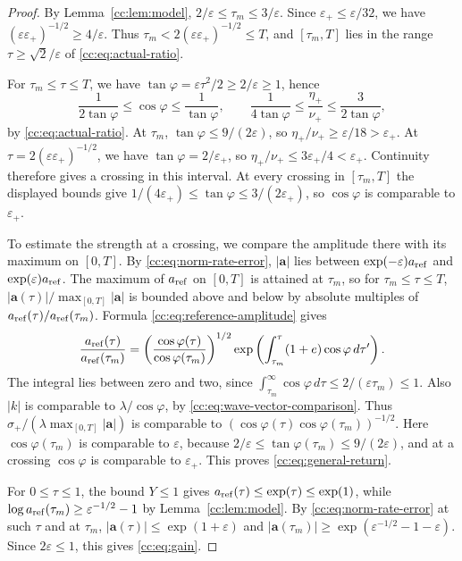 \begin{proof}
By Lemma~\ref{cc:lem:model}, $2/\varepsilon\le\tau_m\le3/\varepsilon$.
Since $\varepsilon_+\le\varepsilon/32$, we have
$(\varepsilon\varepsilon_+)^{-1/2}\ge4/\varepsilon$. Thus
$\tau_m<2(\varepsilon\varepsilon_+)^{-1/2}\le T$, and $[\tau_m,T]$ lies
in the range $\tau\ge\sqrt2/\varepsilon$ of \eqref{cc:eq:actual-ratio}.

For $\tau_m\le\tau\le T$, we have
$\tan\varphi=\varepsilon\tau^2/2\ge2/\varepsilon\ge1$, hence
\[
 \frac1{2\tan\varphi}\le\cos\varphi\le\frac1{\tan\varphi},\qquad
 \frac1{4\tan\varphi}\le\frac{\eta_+}{\nu_+}\le\frac3{2\tan\varphi},
\]
by \eqref{cc:eq:actual-ratio}. At $\tau_m$,
$\tan\varphi\le9/(2\varepsilon)$, so
$\eta_+/\nu_+\ge\varepsilon/18>\varepsilon_+$. At
$\tau=2(\varepsilon\varepsilon_+)^{-1/2}$, we have
$\tan\varphi=2/\varepsilon_+$, so
$\eta_+/\nu_+\le3\varepsilon_+/4<\varepsilon_+$.
Continuity therefore gives a crossing in this interval. At every
crossing in $[\tau_m,T]$ the displayed bounds give
$1/(4\varepsilon_+)\le\tan\varphi\le3/(2\varepsilon_+)$, so
$\cos\varphi$ is comparable to $\varepsilon_+$.

To estimate the strength at a crossing, we compare the amplitude there
with its maximum on $[0,T]$. By \eqref{cc:eq:norm-rate-error},
$|\mathbf a|$ lies between $\exp(-\varepsilon)a_{\rm ref}$ and
$\exp(\varepsilon)a_{\rm ref}$. The maximum of $a_{\rm ref}$ on
$[0,T]$ is attained at $\tau_m$, so for $\tau_m\le\tau\le T$,
$|\mathbf a(\tau)|/\max_{[0,T]}|\mathbf a|$ is bounded above and below
by absolute multiples of $a_{\rm ref}(\tau)/a_{\rm ref}(\tau_m)$.
Formula \eqref{cc:eq:reference-amplitude} gives
\[
 \frac{a_{\rm ref}(\tau)}{a_{\rm ref}(\tau_m)}
 =\left(\frac{\cos\varphi(\tau)}{\cos\varphi(\tau_m)}\right)^{1/2}
   \exp\left(\int_{\tau_m}^{\tau}(1+e)\cos\varphi\,d\tau'\right).
\]
The integral lies between zero and two, since
$\int_{\tau_m}^\infty\cos\varphi\,d\tau\le2/(\varepsilon\tau_m)\le1$.
Also $|k|$ is comparable to $\lambda/\cos\varphi$, by
\eqref{cc:eq:wave-vector-comparison}. Thus
$\sigma_+/(\lambda\max_{[0,T]}|\mathbf a|)$ is comparable to
$(\cos\varphi(\tau)\cos\varphi(\tau_m))^{-1/2}$.
Here $\cos\varphi(\tau_m)$ is comparable to $\varepsilon$, because
$2/\varepsilon\le\tan\varphi(\tau_m)\le9/(2\varepsilon)$, and at a
crossing $\cos\varphi$ is comparable to $\varepsilon_+$. This proves
\eqref{cc:eq:general-return}.

For $0\le\tau\le1$, the bound $Y\le1$ gives
$a_{\rm ref}(\tau)\le\exp(\tau)\le\exp(1)$, while
$\log a_{\rm ref}(\tau_m)\ge\varepsilon^{-1/2}-1$ by Lemma~\ref{cc:lem:model}. By \eqref{cc:eq:norm-rate-error} at such $\tau$ and at $\tau_m$,
$|\mathbf a(\tau)|\le\exp(1+\varepsilon)$ and
$|\mathbf a(\tau_m)|\ge\exp(\varepsilon^{-1/2}-1-\varepsilon)$.
Since $2\varepsilon\le1$, this gives \eqref{cc:eq:gain}.
\end{proof}
